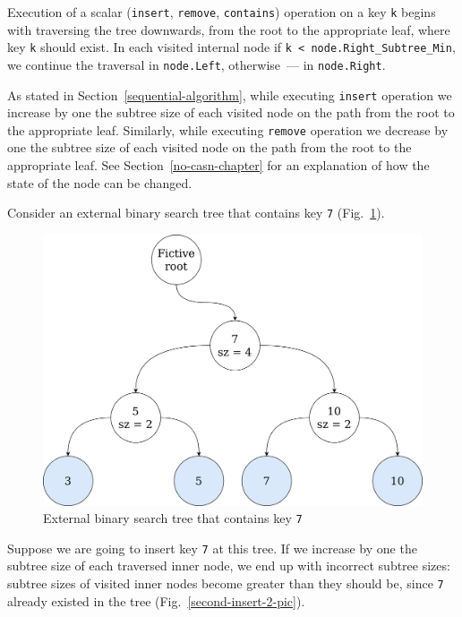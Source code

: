 \documentclass[times, dvipsnames,%
               languages={russian,english} %
              ]{itmo-student-thesis}
\begin{document}
Execution of a scalar (\texttt{insert}, \texttt{remove}, \texttt{contains}) operation on a key \texttt{k} begins with traversing the tree downwards, from the root to the appropriate leaf, where key \texttt{k} should exist. In each visited internal node if \texttt{k < node.Right\_Subtree\_Min}, we continue the traversal in \texttt{node.Left}, otherwise~--- in \texttt{node.Right}.

As stated in Section~\ref{sequential-algorithm}, while executing \texttt{insert} operation we increase by one the subtree size of each visited node on the path from the root to the appropriate leaf. Similarly, while executing \texttt{remove} operation we decrease by one the subtree size of each visited node on the path from the root to the appropriate leaf. See Section~\ref{no-casn-chapter} for an explanation of how the state of the node can be changed.

Consider an external binary search tree that contains key \texttt{7} (Fig.~\ref{second-insert-1-pic}).

\begin{figure}[H]
  \centering
  \caption{External binary search tree that contains key \texttt{7}}
  \label{second-insert-1-pic}
  \includegraphics[width=\linewidth]{pics/second-insert-1.png}
\end{figure}

Suppose we are going to insert key \texttt{7} at this tree. If we increase by one the subtree size of each traversed inner node, we end up with incorrect subtree sizes: subtree sizes of visited inner nodes become greater than they should be, since \texttt{7} already existed in the tree (Fig.~\ref{second-insert-2-pic}).
\end{document}
